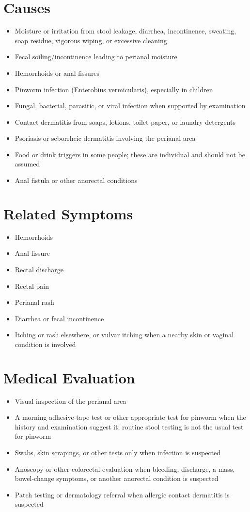 \section*{Causes}
\begin{itemize}
\item Moisture or irritation from stool leakage, diarrhea, incontinence, sweating, soap residue, vigorous wiping, or excessive cleaning
\item Fecal soiling/incontinence leading to perianal moisture
\item Hemorrhoids or anal fissures
\item Pinworm infection (Enterobius vermicularis), especially in children
\item Fungal, bacterial, parasitic, or viral infection when supported by examination
\item Contact dermatitis from soaps, lotions, toilet paper, or laundry detergents
\item Psoriasis or seborrheic dermatitis involving the perianal area
\item Food or drink triggers in some people; these are individual and should not be assumed
\item Anal fistula or other anorectal conditions
\end{itemize}

\section*{Related Symptoms}
\begin{itemize}
\item Hemorrhoids
\item Anal fissure
\item Rectal discharge
\item Rectal pain
\item Perianal rash
\item Diarrhea or fecal incontinence
\item Itching or rash elsewhere, or vulvar itching when a nearby skin or vaginal condition is involved
\end{itemize}

\section*{Medical Evaluation}
\begin{itemize}
\item Visual inspection of the perianal area
\item A morning adhesive-tape test or other appropriate test for pinworm when the history and examination suggest it; routine stool testing is not the usual test for pinworm
\item Swabs, skin scrapings, or other tests only when infection is suspected
\item Anoscopy or other colorectal evaluation when bleeding, discharge, a mass, bowel-change symptoms, or another anorectal condition is suspected
\item Patch testing or dermatology referral when allergic contact dermatitis is suspected
\end{itemize}

